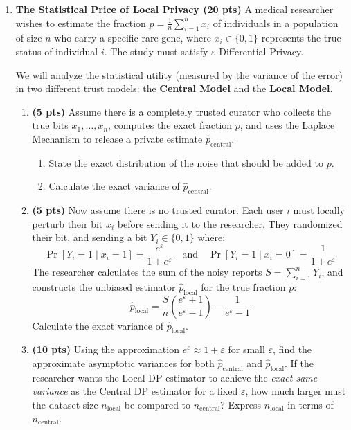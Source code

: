 \documentclass[12pt]{article}
\begin{document}
\begin{enumerate}
\item {\bf The Statistical Price of Local Privacy (20 pts)}
A medical researcher wishes to estimate the fraction $p = \frac{1}{n} \sum_{i=1}^n x_i$ of individuals in a population of size $n$ who carry a specific rare gene, where $x_i \in \{0, 1\}$ represents the true status of individual $i$. The study must satisfy $\varepsilon$-Differential Privacy.

We will analyze the statistical utility (measured by the variance of the error) in two different trust models: the \textbf{Central Model} and the \textbf{Local Model}.

\begin{enumerate}
\item {\bf (5 pts)}
Assume there is a completely trusted curator who collects the true bits $x_1, \dots, x_n$, computes the exact fraction $p$, and uses the Laplace Mechanism to release a private estimate $\hat{p}_{\text{central}}$.
\begin{enumerate}
    \item[1.] State the exact distribution of the noise that should be added to $p$.
    \item[2.] Calculate the exact variance of $\hat{p}_{\text{central}}$.
\end{enumerate}

\item {\bf (5 pts)}
Now assume there is no trusted curator. Each user $i$ must locally perturb their bit $x_i$ before sending it to the researcher. They randomized their bit, and sending a bit $Y_i \in \{0, 1\}$ where:
\[
\Pr[Y_i = 1 \mid x_i = 1] = \frac{e^\varepsilon}{1 + e^\varepsilon} \quad \text{and} \quad \Pr[Y_i = 1 \mid x_i = 0] = \frac{1}{1 + e^\varepsilon}
\]
The researcher calculates the sum of the noisy reports $S = \sum_{i=1}^n Y_i$, and constructs the unbiased estimator $\hat{p}_{\text{local}}$ for the true fraction $p$:
\[
\hat{p}_{\text{local}} = \frac{S}{n} \left( \frac{e^\varepsilon + 1}{e^\varepsilon - 1} \right) - \frac{1}{e^\varepsilon - 1}
\]
Calculate the exact variance of $\hat{p}_{\text{local}}$. 


\item {\bf (10 pts)}
Using the approximation $e^\varepsilon \approx 1 + \varepsilon$ for small $\varepsilon$, find the approximate asymptotic variances for both $\hat{p}_{\text{central}}$ and $\hat{p}_{\text{local}}$. 
If the researcher wants the Local DP estimator to achieve the \textit{exact same variance} as the Central DP estimator for a fixed $\varepsilon$, how much larger must the dataset size $n_{\text{local}}$ be compared to $n_{\text{central}}$? Express $n_{\text{local}}$ in terms of $n_{\text{central}}$.
\end{enumerate}



\end{enumerate}
\end{document}
